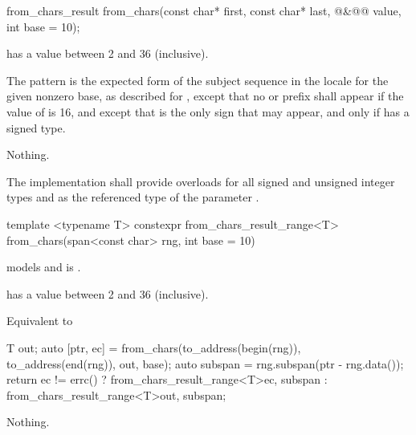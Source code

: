 \documentclass{wg21}
\begin{document}
%
\begin{itemdecl}
    from_chars_result from_chars(const char* first, const char* last,
    @\seebelow@&@\itcorr[-1]@ value, int base = 10);
\end{itemdecl}

\begin{itemdescr}
    \pnum
    \expects
     has a value between 2 and 36 (inclusive).

    \pnum
    \effects
    The pattern is the expected form of the subject sequence
    in the  locale
    for the given nonzero base,
    as described for ,
    except that no  or  prefix shall appear
    if the value of  is 16,
    and except that 
    is the only sign that may appear,
    and only if  has a signed type.

    \pnum
    \throws
    Nothing.

    \pnum
    \remarks
    The implementation shall provide overloads
    for all signed and unsigned integer types
    and 
    as the referenced type of the parameter .
\end{itemdescr}

\begin{addedblock}
%
\begin{itemdecl}
    template <typename T>
    constexpr from_chars_result_range<T>
    from_chars(span<const char> rng, int base = 10)
\end{itemdecl}

\begin{itemdescr}

    \constraints {} models  and  is .

    \pnum
    \expects
     has a value between 2 and 36 (inclusive).

    \pnum
    \effects Equivalent to
    \begin{codeblock}
        T out;
        auto [ptr, ec] = from_chars(to_address(begin(rng)),
                                    to_address(end(rng)), out, base);
        auto subspan = rng.subspan(ptr - rng.data());
        return ec != errc()
            ? from_chars_result_range<T>{ec,  subspan}
            : from_chars_result_range<T>{out, subspan};
    \end{codeblock}
    \pnum
    \throws
    Nothing.
    \pnum
\end{itemdescr}

\end{addedblock}
\end{document}
